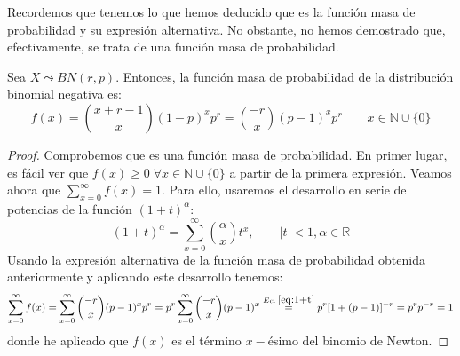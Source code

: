Recordemos que tenemos lo que hemos deducido que es la función masa de probabilidad y su expresión alternativa. No obstante, no hemos demostrado que, efectivamente, se trata de una función masa de probabilidad.
\begin{prop}
    Sea $X\leadsto BN(r,p)$. Entonces, la función masa de probabilidad de la distribución binomial negativa es:
    \begin{equation*}
        f(x)
        = \binom{x+r-1}{x}(1-p)^{x}p^r
        = \binom{-r}{x}(p-1)^xp^r
        \qquad x\in \mathbb{N}\cup \{0\}
    \end{equation*}
\end{prop}
\begin{proof}
    Comprobemos que es una función masa de probabilidad. En primer lugar, es fácil ver que $f(x)\geq 0\;\forall x\in \mathbb{N}\cup \{0\}$ a partir de la primera expresión. Veamos ahora que $\sum\limits_{x=0}^\infty f(x)=1$. Para ello, usaremos el desarrollo en serie de potencias de la función $(1 + t)^\alpha$:
    \begin{equation}\label{eq:1+t}
        (1+t)^\alpha = \sum_{x=0}^\infty \binom{\alpha}{x}t^x,\qquad |t|<1, \alpha\in \mathbb{R}
    \end{equation}
    Usando la expresión alternativa de la función masa de probabilidad obtenida anteriormente y aplicando este desarrollo tenemos:
    \begin{equation*}
        \sum_{x=0}^\infty f(x)
        = \sum_{x=0}^\infty \binom{-r}{x}(p-1)^xp^r
        = p^r \sum_{x=0}^\infty \binom{-r}{x}(p-1)^x
        \stackrel{Ec.\;\ref{eq:1+t}}{=} p^r [1+(p-1)]^{-r} = p^rp^{-r}=1
    \end{equation*}
    donde he aplicado que $f(x)$ es el término $x-$ésimo del binomio de Newton.
\end{proof}

